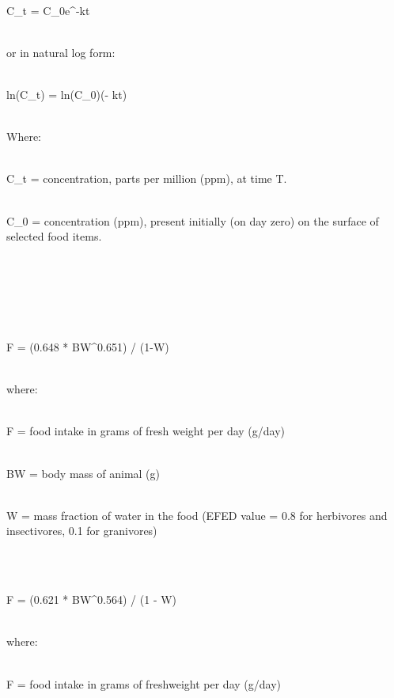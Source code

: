 \\C_{t} = C_{0}e^{-kt}

\\or\;  in\; natural\; log\; form:

\\ln(C_{t}) = ln(C_{0})(- kt) 

\\Where:

\\C_{t} = concentration, \;parts \;per\; million\; (ppm), at\; time\; T.

\\C_{0} = concentration\; (ppm), present \;initially \;(on\; day\; zero)\; on \;the \;surface\; of\; selected\; food\; items. 




\\ 
\\

\\

\\F = (0.648 * BW^{0.651}) / (1-W)

\\where:

\\F = food \; intake \; in \; grams  \;of \; fresh  \;weight \; per \; day  \;(g/day)

\\BW = body  \;mass  \;of \; animal \; (g)

\\W = mass \; fraction \; of  \;water \; in \; the \; food \; (EFED  \;value = 0.8  \;for  \;herbivores \; and  \;insectivores, 0.1 \; for  \;granivores)





\\

\\F = (0.621 * BW^{0.564}) / (1 - W)

\\where:

\\F = food\; intake\; in\; grams\; of \;fresh\;weight\; per \;day (g/day)

